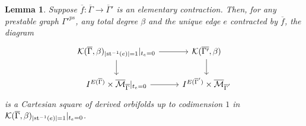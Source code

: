 \documentclass[11pt,psamsfonts, oneside, reqno]{amsart}
\newcommand{\cc}[1]{\overline{#1}}
\newcommand{\inv}{^{-1}}
\newcommand{\cl}{\colon}
\newcommand{\Mbar}{\overline{\mathcal M}}
\newcommand{\cK}{\mathcal{K}}
\newcommand{\stb}{\normalfont\text{st}}
\newcommand{\ov}[1]{\overline{#1}}
\newtheorem{lemma}[theorem]{Lemma}
\theoremstyle{definition}
\theoremstyle{remark}
\numberwithin{equation}{section}
\begin{document}
\begin{lemma}\label{lem:gkc-fibre-product}
	Suppose $\ov{f}\cl \ov{\Gamma}\to \ov{\Gamma}'$ is an elementary contraction. Then, for any prestable graph ${\Gamma'}^{ps}$, any total degree $\beta$ and the unique edge $e$ contracted by $\ov{f}$, the diagram 
	\begin{equation}\label{dig:contraction-square}
		\begin{tikzcd}
			\cK(\ov\Gamma,\beta)_{|\stb\inv(e)|=1}|_{t_e = 0} \arrow[r] \arrow[d] & \cK(\ov{\Gamma'},\beta)\arrow[d]\\
			I^{E(\cc \Gamma)}\times \Mbar_{\cc \Gamma} |_{t_e = 0} \arrow[r] &I^{E(\cc \Gamma')}\times\Mbar_{\cc \Gamma'} 
		\end{tikzcd}
	\end{equation}
	is a Cartesian square of derived orbifolds up to codimension $1$ in $\cK(\cc\Gamma,\beta)_{|\stb\inv(e)|=1}|_{t_e = 0}$.
\end{lemma}
\end{document}
